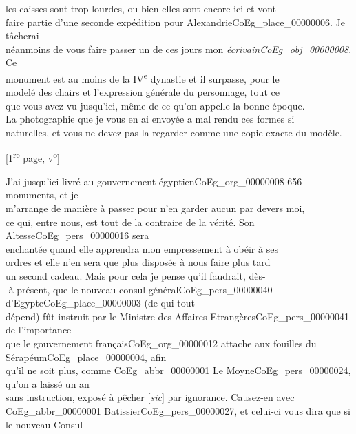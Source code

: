 \documentclass{book}
\begin{document}
les caisses sont trop lourdes, ou bien elles sont encore ici et vont\\
faire partie d’une seconde expédition pour Alexandrie\gls{CoEg_place_00000006}. Je tâcherai\\
néanmoins de vous faire passer un de ces jours mon \textit{écrivain\gls{CoEg_obj_00000008}}. Ce\\
monument est au moins de la IV\textsuperscript{e} dynastie et il surpasse, pour le\\
modelé des chairs et l’expression générale du personnage, tout ce\\
que vous avez vu jusqu’ici, même de ce qu’on appelle la bonne époque.\\
La photographie que je vous en ai envoyée a mal rendu ces formes si\\
naturelles, et vous ne devez pas la regarder comme une copie exacte du modèle.
{\footnotesize \begin{center} {[1\textsuperscript{re} page, v\textsuperscript{o}]}\end{center}}
\indent J’ai jusqu’ici livré au gouvernement égyptien\gls{CoEg_org_00000008} 656 monuments, et je\\
m’arrange de manière à passer pour n’en garder aucun par devers moi,\\
ce qui, entre nous, est tout de la contraire de la vérité. Son Altesse\gls{CoEg_pers_00000016} sera\\
enchantée quand elle apprendra mon empressement à obéir à ses\\
ordres et elle n’en sera que plus disposée à nous faire plus tard\\
un second cadeau. Mais pour cela je pense qu’il faudrait, dès-\\
-à-présent, que le nouveau consul-général\gls{CoEg_pers_00000040} d’Egypte\gls{CoEg_place_00000003} (de qui tout\\
dépend) fût instruit par le Ministre des Affaires Etrangères\gls{CoEg_pers_00000041} de l’importance\\
que le gouvernement français\gls{CoEg_org_00000012} attache aux fouilles du Sérapéum\gls{CoEg_place_00000004}, afin\\
qu’il ne soit plus, comme \gls{CoEg_abbr_00000001} Le Moyne\gls{CoEg_pers_00000024}, qu’on a laissé un an\\
sans instruction, exposé à pêcher {[\textit{sic}]} par ignorance. Causez-en avec\\
\gls{CoEg_abbr_00000001} Batissier\gls{CoEg_pers_00000027}, et celui-ci vous dira que si le nouveau Consul-\\
\end{document}
